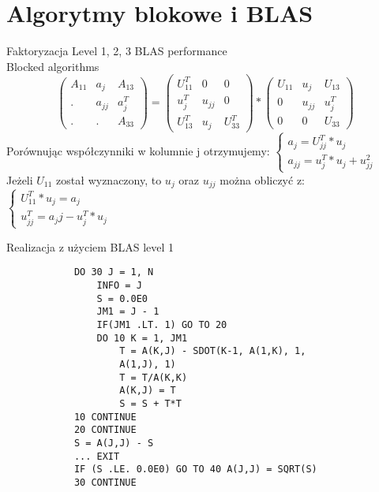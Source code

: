 \section{Algorytmy blokowe i BLAS}
	\begin{frame}{Faktoryzacja}
		Level 1, 2, 3 BLAS performance \\
		Blocked algorithms \\
		$$
		\begin{pmatrix}
		A_{11} & a_j & A_{13} \\
		. & a_{jj} & a_j^T \\
		. & . & A_{33}
		\end{pmatrix}
		=
		\begin{pmatrix}
		U_{11}^T & 0 & 0 \\
		u_j^T & u_{jj} & 0 \\
		U_{13}^T & u_j & U_{33}^T
		\end{pmatrix}
		*
		\begin{pmatrix}
		U_{11} & u_j  & U_{13} \\
		0 & u_{jj} & u_j^T \\
		0 & 0 & U_{33}
		\end{pmatrix}
		$$
		Porównując współczynniki w kolumnie j otrzymujemy:
		$
		\begin{cases}
		a_j = U_{jj}^T * u_j \\
		a_{jj} = u_j^T * u_j + u_{jj}^2
		\end{cases}
		$ \\
		Jeżeli $U_{11}$ został wyznaczony, to $u_j$ oraz $u_{jj}$ można obliczyć z:
		$
		\begin{cases}
		U_{11}^T * u_j = a_j \\
		u_{jj}^T = a_jj - u_j^T * u_{j}
		\end{cases}
		$
	\end{frame}
	\begin{frame}[fragile]{Realizacja z użyciem BLAS level 1}
		\begin{lstlisting}
			DO 30 J = 1, N
				INFO = J
				S = 0.0E0
				JM1 = J - 1
				IF(JM1 .LT. 1) GO TO 20
				DO 10 K = 1, JM1
					T = A(K,J) - SDOT(K-1, A(1,K), 1,
					A(1,J), 1)
					T = T/A(K,K)
					A(K,J) = T
					S = S + T*T
			10 CONTINUE
			20 CONTINUE
			S = A(J,J) - S
			... EXIT
			IF (S .LE. 0.0E0) GO TO 40 A(J,J) = SQRT(S)
			30 CONTINUE		
		\end{lstlisting}
	\end{frame}
